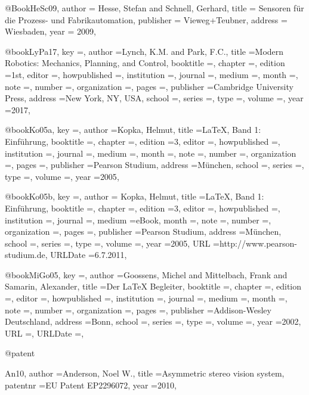 @Book{HeSc09,
  author    = {Hesse, Stefan and Schnell, Gerhard},
  title     = {{Sensoren f{\"u}r die Prozess- und Fabrikautomation}},
  publisher = {Vieweg+Teubner},
  address   = {Wiesbaden},
  year      = {2009},
}

@book{LyPa17,
	key					={},
	author				={Lynch, K.M. and Park, F.C.},
	title				={{Modern Robotics: Mechanics, Planning, and Control}},
	booktitle			={},
	chapter				={},
	edition				={1st},
	editor				={},
	howpublished		={},
	institution			={},
	journal				={},
	medium				={},
	month				={},
	note				={},
	number				={},
	organization		={},
	pages				={},
	publisher			={Cambridge University Press},
	address				={New York, NY, USA},
	school				={},
	series				={},
	type				={},
	volume				={},
	year				={2017},
}


@book{Ko05a,
	key					={},
	author				={Kopka, Helmut},
	title				={{LaTeX, Band 1: Einf{\"u}hrung}},
	booktitle			={},
	chapter				={},
	edition				={3},
	editor				={},
	howpublished		={},
	institution			={},
	journal				={},
	medium				={},
	month				={},
	note				={},
	number				={},
	organization		={},
	pages				={},
	publisher			={Pearson Studium},
	address				={{M{\"u}nchen}},
	school				={},
	series				={},
	type				={},
	volume				={},
	year				={2005},
}

@book{Ko05b,
	key					={},
	author				= {Kopka, Helmut},
	title				={{LaTeX, Band 1: Einf{\"u}hrung}},
	booktitle			={},
	chapter				={},
	edition				={3},
	editor				={},
	howpublished		={},
	institution			={},
	journal				={},
	medium				={eBook},
	month				={},
	note				={},
	number				={},
	organization		={},
	pages				={},
	publisher			={Pearson Studium},
	address				={{M{\"u}nchen}},
	school				={},
	series				={},
	type				={},
	volume				={},
	year				={2005},
	URL	  				={http://www.pearson-studium.de},
	URLDate				={6.7.2011},
}

@book{MiGo05,
	key					={},
	author				={Goossens, Michel and Mittelbach, Frank and Samarin, Alexander},
	title				={Der LaTeX Begleiter},
	booktitle			={},
	chapter				={},
	edition				={},
	editor				={},
	howpublished		={},
	institution			={},
	journal				={},
	medium				={},
	month				={},
	note				={},
	number				={},
	organization		={},
	pages				={},
	publisher			={Addison-Wesley Deutschland},
	address				={Bonn},
	school				={},
	series				={},
	type				={},
	volume				={},
	year				={2002},
	URL	  				={},
	URLDate				={},
}

@patent{An10,
	author				={Anderson, Noel W.},
	title				={{Asymmetric stereo vision system}},
	patentnr			={EU Patent EP2296072},
	year				={2010},

}

